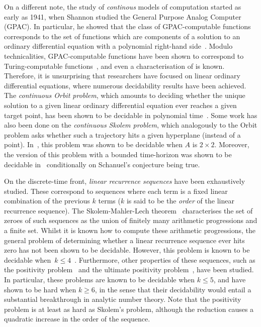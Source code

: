 On a different note, the study of \emph{continous} models of computation started as early as 1941, when Shannon studied the General Purpose Analog Computer (GPAC).
In particular, he showed that the class of GPAC-computable functions corresponds to the set of functions which are components of a solution to an ordinary differential equation with a polynomial right-hand side~\cite{Shannon1941}.
Modulo technicalities, GPAC-computable functions have been shown to correspond to Turing-computable functions~\cite{Bournez1,Bournez2}, and even a characterisation of \PTIME{} is known.
Therefore, it is unsurprising that researchers have focused on linear ordinary differential equations, where numerous decidability results have been achieved.
The \emph{continuous Orbit problem}, which amounts to deciding whether the unique solution to a given linear ordinary differential equation ever reaches a given target point, has been shown to be decidable in polynomial time~\cite{Hainry08,ContinuousOrbitIPL}.
Some work has also been done on the \emph{continuous Skolem problem}, which analogously to the Orbit problem asks whether such a trajectory hits a given hyperplane (instead of a point).
In~\cite{ContinuousSkolem}, this problem was shown to be decidable when $A$ is $2 \times 2$.
Moreover, the version of this problem with a bounded time-horizon was shown to be decidable in~\cite{ContinuousSkolem3} conditionally on Schanuel's conjecture being true.

On the discrete-time front, \emph{linear recurrence sequences} have been exhaustively studied. These correspond to sequences where each term is a fixed linear combination of the previous $k$ terms ($k$ is said to be the \emph{order} of the linear recurrence sequence). The Skolem-Mahler-Lech theorem~\cite{Sko34,Mah35,Lec53,Hansel85} characterises the set of zeroes of such sequences as the union of finitely many arithmetic progressions and a finite set. Whilst it is known how to compute these arithmetic progressions\cite{BM76}, the general problem of determining whether a linear recurrence sequence ever hits zero has not been shown to be decidable. However, this problem is known to be decidable when~$k \leq 4$~\cite{Ver85}.
Furthermore, other properties of these sequences, such as the positivity problem~\cite{BG07,HHH06,LT09,OW13:constructive-positivity,OW14:SODA,Liu10} and the ultimate positivity problem~\cite{OuaknineW13b}, have been studied.
In particular, these problems are known to be decidable when $k \leq 5$, and have shown to be hard when $k \geq 6$, in the sense that their decidability would entail a substantial breakthrough in analytic number theory. Note that the positivity problem is at least as hard as Skolem's problem, although the reduction causes a quadratic increase in the order of the sequence.

